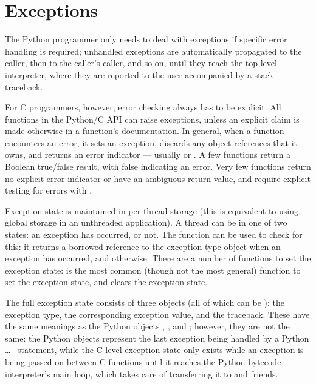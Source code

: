\documentclass{manual}
\begin{document}
\section{Exceptions \label{exceptions}}

The Python programmer only needs to deal with exceptions if specific 
error handling is required; unhandled exceptions are automatically 
propagated to the caller, then to the caller's caller, and so on, until
they reach the top-level interpreter, where they are reported to the 
user accompanied by a stack traceback.

For C programmers, however, error checking always has to be explicit.  
All functions in the Python/C API can raise exceptions, unless an 
explicit claim is made otherwise in a function's documentation.  In 
general, when a function encounters an error, it sets an exception, 
discards any object references that it owns, and returns an 
error indicator --- usually \NULL{} or .  A few functions 
return a Boolean true/false result, with false indicating an error.
Very few functions return no explicit error indicator or have an 
ambiguous return value, and require explicit testing for errors with 
.

Exception state is maintained in per-thread storage (this is 
equivalent to using global storage in an unthreaded application).  A 
thread can be in one of two states: an exception has occurred, or not.
The function  can be used to check for
this: it returns a borrowed reference to the exception type object
when an exception has occurred, and \NULL{} otherwise.  There are a
number of functions to set the exception state:
 is the most
common (though not the most general) function to set the exception
state, and  clears the
exception state.

The full exception state consists of three objects (all of which can 
be \NULL{}): the exception type, the corresponding exception 
value, and the traceback.  These have the same meanings as the Python
objects , , and
; however, they are not the same: the Python
objects represent the last exception being handled by a Python 
 \ldots\  statement, while the C level
exception state only exists while an exception is being passed on
between C functions until it reaches the Python bytecode interpreter's 
main loop, which takes care of transferring it to 
and friends.
\end{document}
